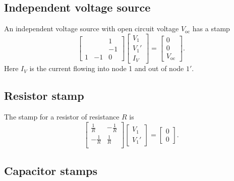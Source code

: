 \documentclass[a4paper, 12pt]{article}
\newcommand{\Voc}{V_{\mathrm{oc}}}
\begin{document}
\subsection{Independent voltage source}

An independent voltage source with open circuit voltage $\Voc$ has a
stamp
%
\begin{equation}
  \begin{bmatrix}
    &  & 1  \\
    &  & -1 \\
    1 & -1 & 0
  \end{bmatrix}
  \begin{bmatrix}
    V_1 \\ V_1' \\ I_V
  \end{bmatrix}
  =
  \begin{bmatrix}
    0 \\
    0 \\
    \Voc
  \end{bmatrix}.
\end{equation}
%
Here $I_V$ is the current flowing into node 1 and out of node $1'$.


\subsection{Resistor stamp}

The stamp for a resistor of resistance $R$ is
%
\begin{equation}
  \begin{bmatrix}
    \frac{1}{R} & -\frac{1}{R} \\
    -\frac{1}{R} & \frac{1}{R} \\
  \end{bmatrix}
  \begin{bmatrix}
    V_1 \\ V_1'
  \end{bmatrix}
  =
  \begin{bmatrix}
    0 \\ 0
  \end{bmatrix}.
\end{equation}


\subsection{Capacitor stamps}
\end{document}
